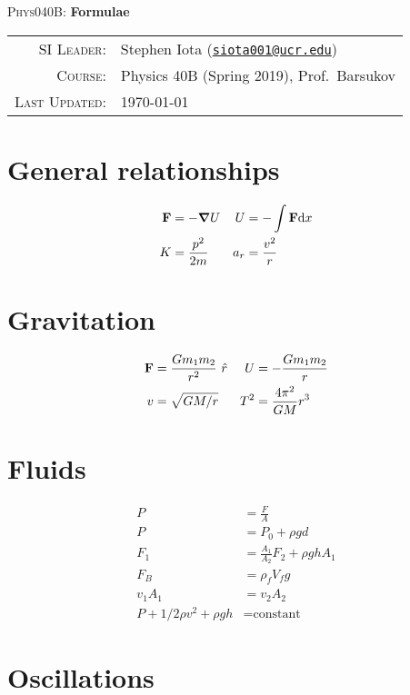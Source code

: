 \documentclass[11pt]{article}
\newcommand{\email}[1]{\texttt{\href{mailto:#1}{#1}}}
\begin{document}
\begin{center}

\Large{\textsc{Phys040B}: \textbf{Formulae}}
\end{center}
\vspace{.5mm}



\begin{tabular}{rl}
\textsc{SI Leader}:
&
Stephen Iota (\email{siota001@ucr.edu})
\\
\textsc{Course}:
&
Physics 40B (Spring 2019), Prof.~Barsukov
\\
\textsc{Last Updated}:
&
\today
\end{tabular}


\section{General relationships}

\begin{align*}
\vb{F} &= -\grad{U}
&
U &= -\int \vb{F} \text{d}x
\\
K &= \frac{p^2}{2m}
&
a_r &= \frac{v^2}{r}
\end{align*}



\section{Gravitation}

\begin{align*}
\vb{F} &= \frac{Gm_1m_2}{r^2} \ \hat{r}
&
U &= -\frac{Gm_1m_2}{r}
\\
v &= \sqrt{GM/r}
&
T^2 &= \frac{4\pi^2}{GM}r^3
\\
\end{align*}




\section{Fluids}


\begin{align*}
P &= \frac{F}{A}
\\
P &= P_0 + \rho gd
\\
F_1 &= \frac{A_1}{A_2} F_2 + \rho ghA_1
\\
F_B &= \rho_f V_fg
\\
v_1A_1 &= v_2A_2
\\
P + 1/2\rho v^2 + \rho gh &= \text{constant}
\end{align*}




\section{Oscillations}
\end{document}
